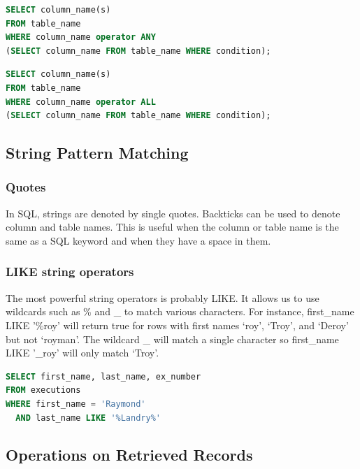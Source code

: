 \documentclass{article}
\begin{document}
\vspace{8pt} \begin{lstlisting}[language=SQL]
SELECT column_name(s)
FROM table_name
WHERE column_name operator ANY
(SELECT column_name FROM table_name WHERE condition);
\end{lstlisting} \vspace{8pt}

\vspace{8pt} \begin{lstlisting}[language=SQL]
SELECT column_name(s)
FROM table_name
WHERE column_name operator ALL
(SELECT column_name FROM table_name WHERE condition);
\end{lstlisting} \vspace{8pt}

\subsection{String Pattern Matching}
\subsubsection{Quotes}

In SQL, strings are denoted by single quotes. Backticks can be used to denote column and table names. This is useful when the column or table name is the same as a SQL keyword and when they have a space in them.

\subsubsection{LIKE string operators}

The most powerful string operators is probably LIKE. It allows us to use wildcards such as \% and \_ to match various characters. For instance, first\_name LIKE '\%roy' will return true for rows with first names ‘roy’, ‘Troy’, and ‘Deroy’ but not ‘royman’. The wildcard \_ will match a single character so first\_name LIKE '\_roy' will only match ‘Troy’.

\vspace{8pt} \begin{lstlisting}[language=SQL]
SELECT first_name, last_name, ex_number
FROM executions
WHERE first_name = 'Raymond'
  AND last_name LIKE '%Landry%'
\end{lstlisting} \vspace{8pt}


\subsection{Operations on Retrieved Records}
\end{document}
